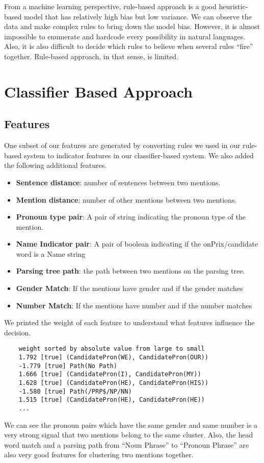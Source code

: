 \documentclass[letterpaper]{article}
\begin{document}
\vspace{0.25cm}

From a machine learning perspective, rule-based approach is a good heuristic-based model that has relatively high bias but low variance. We can observe the data and make complex rules to bring down the model bias. However, it is almost impossible to enumerate and hardcode every possibility in natural languages. Also, it is also difficult to decide which rules to believe when several rules ``fire'' together. Rule-based approach, in that sense, is limited.

\section{Classifier Based Approach}
\subsection{Features}
One subset of our features are generated by converting rules we used in our rule-based system to indicator features in our classifier-based system. We also added the following additional features.
\begin{itemize}
\item \textbf{Sentence distance}: number of sentences between two mentions.
\item \textbf{Mention distance}: number of other mentions between two mentions.
\item \textbf{Pronoun type pair}: A pair of string indicating the pronoun type of the mention. 
\item \textbf{Name Indicator pair}: A pair of boolean indicating if the onPrix/candidate word is a Name string
\item \textbf{Parsing tree path}: the path between two mentions on the parsing tree.
\item \textbf{Gender Match}: If the mentions have gender and if the gender matches
\item \textbf{Number Match}: If the mentions have number and if the number matches
\end{itemize}

We printed the weight of each feature to understand what features influence the decision. 
\begin{verbatim}
    weight sorted by absolute value from large to small
    1.792 [true] (CandidatePron(WE), CandidatePron(OUR))
    -1.779 [true] Path(No Path)
    1.666 [true] (CandidatePron(I), CandidatePron(MY))
    1.628 [true] (CandidatePron(HE), CandidatePron(HIS))
    -1.580 [true] Path(/PRP$/NP/NN)
    1.515 [true] (CandidatePron(HE), CandidatePron(HE))
    ...
\end{verbatim}
We can see the pronoun pairs which have the same gender and same number is a very strong signal that two mentions belong to the same cluster. 
Also, the head word match and a parsing path from ``Noun Phrase'' to ``Pronoun Phrase'' are also very good features for clustering two mentions together.
\end{document}
